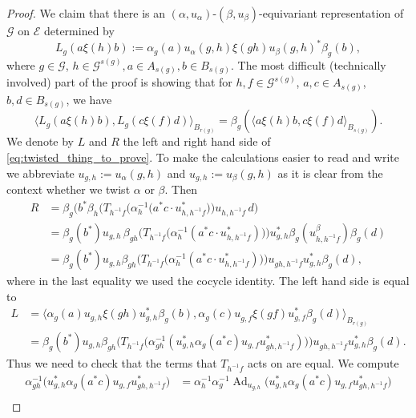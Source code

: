\documentclass[11 pt, leqno]{amsart}
\numberwithin{equation}{section}
\theoremstyle{plain}
\theoremstyle{definition}
\DeclareMathOperator{\Ad}{Ad}
\newcommand{\G}{\mathcal G} %
\newcommand{\EE}{\mathcal E}
\begin{document}
\begin{proof}
We claim that there is an $(\alpha,u_{\alpha})$-$(\beta,u_{\beta})$-equivariant representation of $\G$ on $\EE$ determined by
\begin{equation}\label{eq:Ldef} 
    L_g (a \xi(h)b) := \alpha_g(a)u_{\alpha}{(g,h)} \xi(gh)u_{\beta}(g,h)^*\beta_g(b),
\end{equation}
where $g\in \G$, $h \in \G^{s(g)}, a \in A_{s(g)}, b \in B_{s(g)}$. 
The most difficult (technically involved) part of the proof is showing that for $h, f \in \G^{s(g)}$, $a, c \in A_{s(g)}$, $b, d \in B_{s(g)}$, we have 
\begin{equation}\label{eq:twisted_thing_to_prove} 
    \langle L_g (a \xi(h)b) , L_g (c \xi(f)d) \rangle_{B_{r(g)}} = \beta_g(\langle a \xi(h)b , c \xi(f)d\rangle_{B_{s(g)}}).
\end{equation}
We denote by $L$ and $R$ the left and right hand side of \eqref{eq:twisted_thing_to_prove}. 
To make the calculations easier to read and write we abbreviate $u_{g,h} := u_{\alpha}{(g,h)}$ and $u_{g,h}:=u_{\beta}{(g,h)}$ as it is clear from the context whether we twist $\alpha$ or $\beta$. 
Then 
\[
\begin{split}
    R &= \beta_g \Big( b^*\beta_{h} \Big(T_{h^{-1} f} \big( \alpha_h^{-1}( a^* c\cdot  u^{*}_{h,h^{-1}f} \big) \Big) u_{h,h^{-1}f}\, d\Big) \\
    &= \beta_g(b^*)u_{g,h}\,\beta_{gh} \Big( T_{h^{-1} f} \big( \alpha_h^{-1}( a^* c\cdot  u^{*}_{h,h^{-1}f}) \big) \Big) u^{*}_{g,h} \beta_g(u^{\beta}_{h,h^{-1}f}) \beta_g(d) \\
    &= \beta_g(b^*)u_{g,h} \beta_{gh} \Big( T_{h^{-1} f} \big( \alpha_h^{-1}( a^* c\cdot  u^{*}_{h,h^{-1}f}) \big) \Big) u_{gh,h^{-1}f} u^{*}_{g,h} \beta_g(d) ,
\end{split}
\]
where in the last equality we used the cocycle identity. 
The left hand side is equal to 
\[
\begin{split} 
    L &= \Big \langle \alpha_g(a)u_{g,h} \xi(gh)u^{*}_{g,h}\beta_g(b) , \alpha_g(c)u^{}_{g,f} \xi(gf)u^{*}_{g,f}\beta_g(d)  \Big\rangle_{B_{r(g)}} \\
        &= \beta_g(b^*)u_{g,h}\beta_{gh} \Big(T_{h^{-1} f} \big(\alpha_{gh}^{-1}(u^{*}_{g,h}  \alpha_g(a^* c)u_{g,f} u^{*}_{gh,h^{-1}f}) \big)\Big) u_{gh,h^{-1}f}u^{*}_{g,h} \beta_g(d).
\end{split}
\]
Thus we need to check that the terms that $T_{h^{-1} f}$ acts on are equal. 
We compute 
\[
\begin{split} 
    \alpha_{gh}^{-1} \big(u^{*}_{g,h} \alpha_g(a^* c)u_{g,f} u^{*}_{gh,h^{-1}f}\big) &= \alpha_{h}^{-1} \alpha_{g}^{-1} \Ad_{u_{g,h}} \big( u^{*}_{g,h}  \alpha_g(a^* c)u_{g,f} u^{*}_{gh,h^{-1}f} \big) \\

\end{split}\]
\end{proof}
\end{document}
